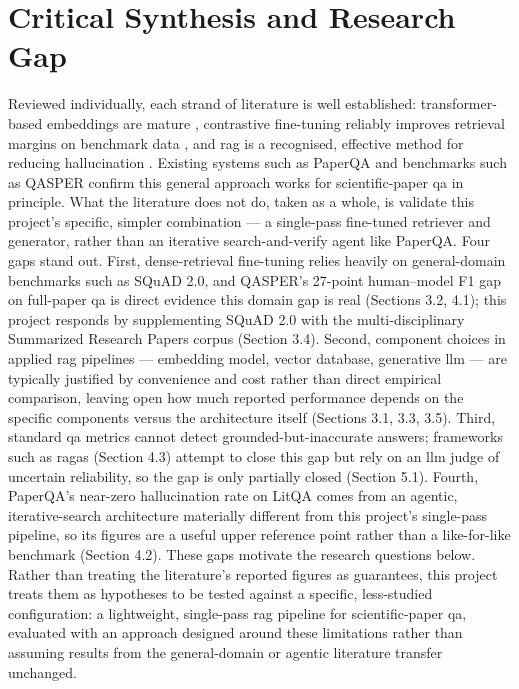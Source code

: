 \section{Critical Synthesis and Research Gap}

Reviewed individually, each strand of literature is well established: transformer-based embeddings are mature \citep{vaswani2017attention, reimers2019sentence}, contrastive fine-tuning reliably improves retrieval margins on benchmark data \citep{rajpurkar2018know}, and \gls{rag} is a recognised, effective method for reducing hallucination \citep{lewis2020retrieval, karpukhin2020dense, ji2023survey}. Existing systems such as PaperQA \citep{lala2023paperqa} and benchmarks such as QASPER \citep{dasigi2021dataset} confirm this general approach works for scientific-paper \gls{qa} in principle. What the literature does not do, taken as a whole, is validate this project's specific, simpler combination — a single-pass fine-tuned retriever and generator, rather than an iterative search-and-verify agent like PaperQA.
\newline \newline Four gaps stand out. First, dense-retrieval fine-tuning relies heavily on general-domain benchmarks such as SQuAD 2.0, and QASPER's 27-point human–model F1 gap on full-paper \gls{qa} is direct evidence this domain gap is real (Sections 3.2, 4.1); this project responds by supplementing SQuAD 2.0 with the multi-disciplinary Summarized Research Papers corpus (Section 3.4). Second, component choices in applied \gls{rag} pipelines — embedding model, vector database, generative \gls{llm} — are typically justified by convenience and cost rather than direct empirical comparison, leaving open how much reported performance depends on the specific components versus the architecture itself (Sections 3.1, 3.3, 3.5). Third, standard \gls{qa} metrics cannot detect grounded-but-inaccurate answers; frameworks such as \gls{ragas} (Section 4.3) attempt to close this gap but rely on an \gls{llm} judge of uncertain reliability, so the gap is only partially closed (Section 5.1). Fourth, PaperQA's near-zero hallucination rate on LitQA comes from an agentic, iterative-search architecture materially different from this project's single-pass pipeline, so its figures are a useful upper reference point rather than a like-for-like benchmark (Section 4.2).
\newline \newline These gaps motivate the research questions below. Rather than treating the literature's reported figures as guarantees, this project treats them as hypotheses to be tested against a specific, less-studied configuration: a lightweight, single-pass \gls{rag} pipeline for scientific-paper \gls{qa}, evaluated with an approach designed around these limitations rather than assuming results from the general-domain or agentic literature transfer unchanged.

